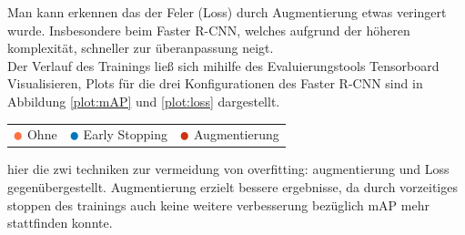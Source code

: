\begin{table}[H]
\begin{tabular}{m{}m{}|m{}<{\centering}m{}<{\centering}}
  \end{tabular}
\end{table}

Man kann erkennen das der Feler (Loss) durch Augmentierung etwas 
veringert wurde.
Insbesondere beim Faster R-CNN, welches aufgrund der 
höheren komplexität, schneller zur überanpassung neigt.\\
Der Verlauf des Trainings ließ sich mihilfe des Evaluierungstools Tensorboard
Visualisieren, Plots für die drei Konfigurationen des Faster R-CNN sind in 
Abbildung \ref{plot:mAP} und \ref{plot:loss} dargestellt.
\vspace{0.5cm}

\begin{figure}[htb]
\begin{minipage}{0.5\textwidth}
  \centering
  \label{plot:mAP}
  \def\svgwidth{0.9\textwidth}
  
\end{minipage}
\begin{minipage}{0.5\textwidth}
  \centering
  \label{plot:Loss}
  \def\svgwidth{0.9\textwidth}
  
\end{minipage}
\end{figure}


\begin{table}[htb]
  \centering
  \begin{tabular}{m{}<{\centering}m{}<{\centering}m{}<{\centering}}
    $\color[HTML]{FF7043}\medbullet$  Ohne & $\color[HTML]{0077BB}\medbullet$  Early Stopping & $\color[HTML]{CC3311}\medbullet$  Augmentierung
  \end{tabular}    
\end{table}




hier die zwi techniken zur vermeidung von overfitting: augmentierung
und Loss gegenübergestellt. Augmentierung erzielt bessere ergebnisse, 
da durch vorzeitiges stoppen des trainings auch keine weitere verbesserung
bezüglich mAP mehr stattfinden konnte.




